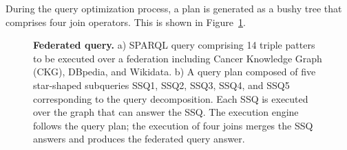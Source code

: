\documentclass[a4paper,USenglish]{tgdk-v2021}
\newcommand{\arxivonly}[1]{}
\begin{document}
\begin{itemize}
    \arxivonly{The physical operators implemented by the SPARQL federated query engine ANAPSID~\cite{DBLP:conf/semweb/AcostaVLCR11} implement intra-operator adaptivity, enabling results generation even when the graphs became blocked.
    On the other hand, inter-operator adaptive strategies can produce an answer as soon as it is computed and can keep producing intermediate results even when data from a source becomes blocked. 
    Acosta and Vidal~\cite{DBLP:conf/semweb/AcostaV15} propose adaptive query processing techniques that enable the re-ordering of a query execution plan to adjust execution schedulers to unexpected environmental conditions (e.\,g., changes at rates at which tuples arrive from graphs or a graph's availability).}
\end{itemize}

During the query optimization process, a plan is generated as a bushy tree that comprises four join operators.  
This is shown in Figure~\ref{fig:federatedQuery}.

\begin{figure}[!ht]
\centering
{}
\caption{\textbf{Federated query.} a) SPARQL query comprising 14 triple patters to be executed over a federation including Cancer Knowledge Graph (CKG), DBpedia, and Wikidata. b) A query plan composed of five star-shaped subqueries SSQ1, SSQ2, SSQ3, SSQ4, and SSQ5 corresponding to the query decomposition. 
Each SSQ is executed over the graph that can answer the SSQ. The execution engine follows the query plan; the execution of four joins merges the SSQ answers and produces the federated query answer.}
\label{fig:federatedQuery}
\end{figure}
\end{document}
